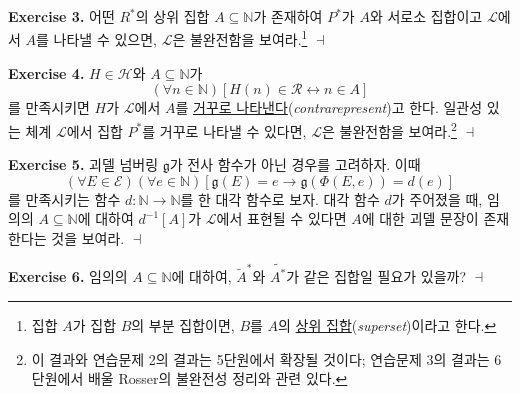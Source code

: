 \documentclass[12pt]{paper}
\newcommand{\gnum}
{ \mathfrak{g} }
\newenvironment{context}[1][]
{ \noindent \textbf{{#1}.} }
{ \hfill $ \dashv $ }
\begin{document}
\begin{context}[Exercise 3]
어떤 $R^{*}$의 상위 집합 $A \subseteq \mathbb{N}$가 존재하여 $P^{*}$가 $A$와 서로소 집합이고 $\mathcal{L}$에서 $A$를 나타낼 수 있으면,
$\mathcal{L}$은 불완전함을 보여라.\footnote
{
집합 $A$가 집합 $B$의 부분 집합이면, $B$를 $A$의 \underline{상위 집합}(\textit{superset})이라고 한다.
}
\end{context}

\begin{context}[Exercise 4]
$H \in \mathcal{H}$와 $A \subseteq \mathbb{N}$가
$$ \left( \forall n \in \mathbb{N} \right) \left[ H \left( n \right) \in \mathcal{R} \leftrightarrow n \in A \right] $$를 만족시키면
$H$가 $\mathcal{L}$에서 $A$를 \underline{거꾸로 나타낸다}(\textit{contrarepresent})고 한다.
일관성 있는 체계 $\mathcal{L}$에서 집합 $P^{*}$를 거꾸로 나타낼 수 있다면,
$\mathcal{L}$은 불완전함을 보여라.\footnote
{
이 결과와 연습문제 2의 결과는 5단원에서 확장될 것이다;
연습문제 3의 결과는 6단원에서 배울 Rosser의 불완전성 정리와 관련 있다.
}
\end{context}

\begin{context}[Exercise 5]
괴델 넘버링 $\gnum$가 전사 함수가 아닌 경우를 고려하자.
이때 $$ \left( \forall E \in \mathcal{E} \right) \left( \forall e \in \mathbb{N} \right) \left[ \gnum \left( E \right) = e \rightarrow \gnum \left( \Phi \left( E , e \right) \right) = d \left( e \right) \right] $$를
만족시키는 함수 $d : \mathbb{N} \to \mathbb{N}$를 한 대각 함수로 보자.
대각 함수 $d$가 주어졌을 때, 임의의 $A \subseteq \mathbb{N}$에 대하여 $d^{-1} \left[ A \right]$가 $\mathcal{L}$에서 표현될 수 있다면 $A$에 대한 괴델 문장이 존재한다는 것을 보여라.
\end{context}

\begin{context}[Exercise 6]
임의의 $A \subseteq \mathbb{N}$에 대하여,
$\widetilde{A}^{*}$와 $\widetilde{A^{*}}$가 같은 집합일 필요가 있을까?
\end{context}
\end{document}
